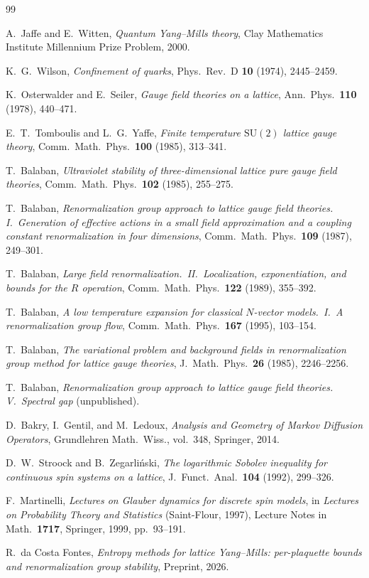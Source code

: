 \documentclass[11pt]{article}
\theoremstyle{definition}
\theoremstyle{remark}
\newcommand{\SU}{\mathrm{SU}}
\begin{document}
\begin{thebibliography}{99}

A.~Jaffe and E.~Witten,
\emph{Quantum Yang--Mills theory},
Clay Mathematics Institute Millennium Prize Problem, 2000.

K.~G.~Wilson,
\emph{Confinement of quarks},
Phys.\ Rev.\ D \textbf{10} (1974), 2445--2459.

K.~Osterwalder and E.~Seiler,
\emph{Gauge field theories on a lattice},
Ann.\ Phys.\ \textbf{110} (1978), 440--471.

E.~T.~Tomboulis and L.~G.~Yaffe,
\emph{Finite temperature $\SU(2)$ lattice gauge theory},
Comm.\ Math.\ Phys.\ \textbf{100} (1985), 313--341.

T.~Balaban,
\emph{Ultraviolet stability of three-dimensional lattice pure gauge 
field theories},
Comm.\ Math.\ Phys.\ \textbf{102} (1985), 255--275.

T.~Balaban,
\emph{Renormalization group approach to lattice gauge field theories.
I.\ Generation of effective actions in a small field approximation 
and a coupling constant renormalization in four dimensions},
Comm.\ Math.\ Phys.\ \textbf{109} (1987), 249--301.

T.~Balaban,
\emph{Large field renormalization.\ II.\ Localization, exponentiation, 
and bounds for the $R$ operation},
Comm.\ Math.\ Phys.\ \textbf{122} (1989), 355--392.

T.~Balaban,
\emph{A low temperature expansion for classical $N$-vector models.\ 
I.\ A renormalization group flow},
Comm.\ Math.\ Phys.\ \textbf{167} (1995), 103--154.

T.~Balaban,
\emph{The variational problem and background fields in 
renormalization group method for lattice gauge theories},
J.\ Math.\ Phys.\ \textbf{26} (1985), 2246--2256.

T.~Balaban,
\emph{Renormalization group approach to lattice gauge field theories.
V.\ Spectral gap} (unpublished).

D.~Bakry, I.~Gentil, and M.~Ledoux,
\emph{Analysis and Geometry of Markov Diffusion Operators},
Grundlehren Math.\ Wiss., vol.~348, Springer, 2014.

D.~W.~Stroock and B.~Zegarli\'nski,
\emph{The logarithmic Sobolev inequality for continuous spin 
systems on a lattice},
J.\ Funct.\ Anal.\ \textbf{104} (1992), 299--326.

F.~Martinelli,
\emph{Lectures on Glauber dynamics for discrete spin models},
in \emph{Lectures on Probability Theory and Statistics} 
(Saint-Flour, 1997), Lecture Notes in Math.\ \textbf{1717},
Springer, 1999, pp.~93--191.

R.~da Costa Fontes,
\emph{Entropy methods for lattice Yang--Mills: per-plaquette bounds 
and renormalization group stability},
Preprint, 2026.

\end{thebibliography}
\end{document}
